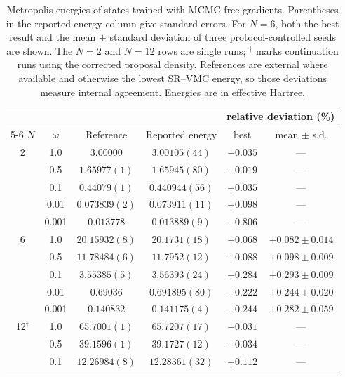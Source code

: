 \begin{table}[htbp]
  \centering
  \caption[Energies from MCMC-free gradient training]{Metropolis energies of
  states trained with MCMC-free gradients. Parentheses in the reported-energy column give
  standard errors. For $N{=}6$,
  both the best result and the mean $\pm$ standard deviation of three protocol-controlled
  seeds are shown. The $N{=}2$ and $N{=}12$ rows are single runs; $^{\dagger}$ marks
  continuation runs using the corrected proposal density. References are external where
  available and otherwise the lowest SR--VMC energy, so those deviations measure internal
  agreement. Energies are in effective Hartree.}
  \label{tab:collocation}
  \begin{tabular}{c c c c c c}
    \toprule
    & & & & \multicolumn{2}{c}{relative deviation (\%)} \\
    \cmidrule(lr){5-6}
    $N$ & $\omega$ & Reference & Reported energy & best & mean $\pm$ s.d. \\
    \midrule
    2 & 1.0   & $3.00000$      & $3.00105(44)$  & $+0.035$ & --- \\
      & 0.5   & $1.65977(1)$   & $1.65945(80)$  & $-0.019$ & --- \\
      & 0.1   & $0.44079(1)$   & $0.440944(56)$ & $+0.035$ & --- \\
      & 0.01  & $0.073839(2)$  & $0.073911(11)$ & $+0.098$ & --- \\
      & 0.001 & $0.013778$     & $0.013889(9)$  & $+0.806$ & --- \\
    \midrule
    6 & 1.0   & $20.15932(8)$  & $20.1731(18)$  & $+0.068$ & $+0.082\pm0.014$ \\
      & 0.5   & $11.78484(6)$  & $11.7952(12)$  & $+0.088$ & $+0.098\pm0.009$ \\
      & 0.1   & $3.55385(5)$   & $3.56393(24)$  & $+0.284$ & $+0.293\pm0.009$ \\
      & 0.01  & $0.69036$      & $0.691895(80)$ & $+0.222$ & $+0.244\pm0.020$ \\
      & 0.001 & $0.140832$     & $0.141175(4)$  & $+0.244$ & $+0.282\pm0.059$ \\
    \midrule
    12$^{\dagger}$ & 1.0 & $65.7001(1)$   & $65.7207(17)$  & $+0.031$ & --- \\
       & 0.5   & $39.1596(1)$   & $39.1727(12)$  & $+0.034$ & --- \\
       & 0.1   & $12.26984(8)$  & $12.28361(32)$ & $+0.112$ & --- \\
    \bottomrule
  \end{tabular}
\end{table}

